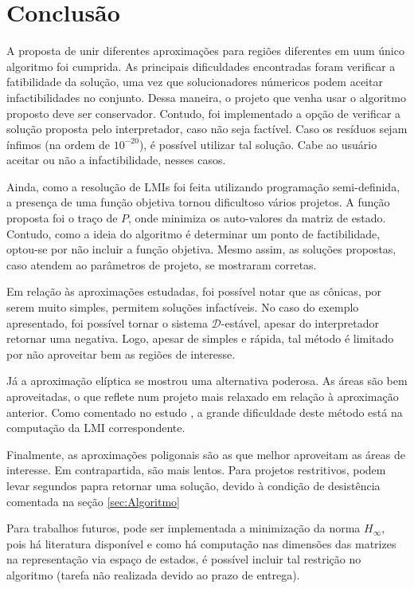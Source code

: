 \chapter{Conclusão}
A proposta de unir diferentes aproximações para regiões diferentes em uum único algoritmo foi cumprida. As principais dificuldades encontradas foram verificar a fatibilidade da solução, uma vez que solucionadores númericos podem aceitar infactibilidades no conjunto. Dessa maneira, o projeto que venha usar o algoritmo proposto deve ser conservador. Contudo, foi implementado a opção de verificar a solução proposta pelo interpretador, caso não seja factível. Caso os resíduos sejam ínfimos (na ordem de $10^{-20}$), é possível utilizar tal solução. Cabe ao usuário aceitar ou não a infactibilidade, nesses casos.

Ainda, como a resolução de LMIs foi feita utilizando programação semi-definida, a presença de uma função objetiva tornou dificultoso vários projetos. A função proposta foi o traço de $P$, onde minimiza os auto-valores da matriz de estado. Contudo, como a ideia do algoritmo é determinar um ponto de factibilidade, optou-se por não incluir a função objetiva. Mesmo assim, as soluções propostas, caso atendem ao parâmetros de projeto, se mostraram corretas.

Em relação às aproximações estudadas, foi possível notar que as cônicas, por serem muito simples, permitem soluções infactíveis. No caso do exemplo apresentado, foi possível tornar o sistema $\mathscr{D}$-estável, apesar do interpretador retornar uma negativa. Logo, apesar de simples e rápida, tal método é limitado por não aproveitar bem as regiões de interesse.

Já a aproximação elíptica se mostrou uma alternativa poderosa. As áreas são bem aproveitadas, o que reflete num projeto mais relaxado em relação à aproximação anterior. Como comentado no estudo , a grande dificuldade deste método está na computação da LMI correspondente.

Finalmente, as aproximações poligonais são as que melhor aproveitam as áreas de interesse. Em contrapartida, são mais lentos. Para projetos restritivos, podem levar segundos papra retornar uma solução, devido à condição de desistência comentada na seção \ref{sec:Algoritmo}

Para trabalhos futuros, pode ser implementada a minimização da norma $H_{\infty}$, pois há literatura disponível e como há computação nas dimensões das matrizes na representação via espaço de estados, é possível incluir tal restrição no algoritmo (tarefa não realizada devido ao prazo de entrega).